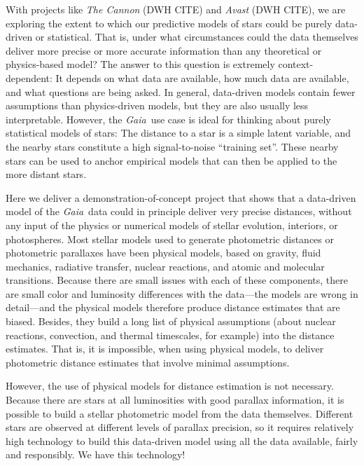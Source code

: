 \documentclass[modern]{aastex61}
\newcommand{\project}[1]{\textsl{#1}}
\newcommand{\gaia}{\project{Gaia}}
\begin{document}
With projects like \project{The Cannon} (DWH CITE) and \project{Avast}
(DWH CITE), we are exploring the extent to which our predictive models of
stars could be purely data-driven or statistical.
That is, under what circumstances could the data themselves deliver
more precise or more accurate information than any theoretical or
physics-based model?
The answer to this question is extremely context-dependent: It depends
on what data are available, how much data are available, and what
questions are being asked.
In general, data-driven models contain fewer assumptions than
physics-driven models, but they are also usually less interpretable.
However, the \gaia\ use case is ideal for thinking about purely statistical
models of stars:
The distance to a star is a simple latent variable, and the nearby
stars constitute a high signal-to-noise ``training set''.
These nearby stars can be used to anchor empirical models that can
then be applied to the more distant stars.

Here we deliver a demonstration-of-concept project that shows that a
data-driven model of the \gaia\ data could in principle deliver very
precise distances, without any input of the physics or numerical models of stellar
evolution, interiors, or photospheres.
Most stellar models used to generate photometric distances or photometric
parallaxes have been physical models, based on gravity, fluid mechanics,
radiative transfer, nuclear reactions, and atomic and molecular transitions.
Because there are small issues with each of these components, there are small
color and luminosity differences with the data---the models are wrong in detail---and
the physical models therefore produce distance estimates that are biased.
Besides, they build a long list of physical assumptions (about
nuclear reactions, convection, and thermal timescales, for example)
into the distance estimates.
That is, it is impossible, when using physical models,
to deliver photometric distance estimates that involve minimal assumptions.

However, the use of physical models for distance estimation is not necessary.
Because there are stars at all luminosities with good parallax information,
it is possible to build a stellar photometric model from the data themselves.
Different stars are observed at different levels of parallax precision,
so it requires relatively high technology to build this data-driven model
using all the data available, fairly and responsibly.
We have this technology!
\end{document}

